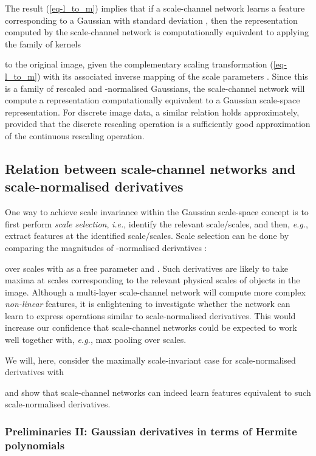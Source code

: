 \documentclass[twocolumn,runningheads]{svjour3}
\begin{document}
The result (\ref{eq-l_to_m}) implies that if a scale-channel network
learns a feature corresponding to a Gaussian with standard
deviation ,
then the representation computed by the scale-channel network is
computationally equivalent to applying the family of kernels

to the original image, given the complementary scaling transformation
(\ref{eq-l_to_m}) with its associated inverse mapping of
the scale parameters .
Since this is a family of rescaled and -normalised Gaussians, the
scale-channel network will compute a representation computationally
equivalent to a Gaussian scale-space representation. 
For discrete image data, a similar relation holds approximately,
provided that the discrete rescaling operation is a sufficiently good approximation of the continuous rescaling operation. 

\subsection{Relation between scale-channel networks and scale-normalised derivatives}

One way to achieve scale invariance within the Gaussian scale-space concept is to first perform \emph{scale
	selection}, {\em i.e.\/}, identify the relevant scale/scales, and then, {\em e.g.\/}, extract features at the identified
scale/scales. Scale selection can be done by comparing the magnitudes of
-normalised derivatives \cite{Lin97-IJCV,Lin98-IJCV}:

over scales with  as a free parameter and . Such derivatives are likely to take maxima
at scales corresponding to the relevant physical scales of objects in
the image.
Although a multi-layer scale-channel network will compute more
complex {\em non-linear\/} features, it is enlightening to investigate whether
the network can learn to express operations similar to scale-normalised derivatives. This would increase our
confidence that scale-channel networks could be expected to work well
together with, {\em e.g.\/}, max pooling over scales.

We will, here, consider the maximally scale-invariant case for scale-normalised derivatives with  

and show that scale-channel networks can indeed learn features equivalent to
such scale-normalised derivatives. 

\subsubsection{Preliminaries II: Gaussian derivatives in terms of Hermite polynomials}
\end{document}
